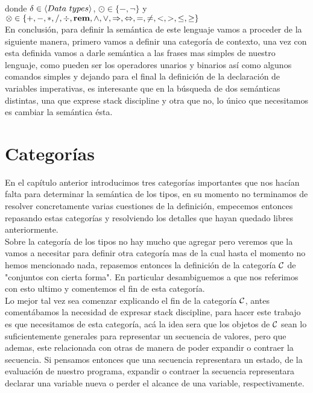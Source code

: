 donde $\delta \in \lrangles{Data \ types}$, $\odot \in \{-, \neg\}$ y 
$\otimes \in \{+,-,*,/,\div,\textbf{rem},\wedge,\vee,\Rightarrow,\Leftrightarrow, =,\neq,<,>,\leq,\geq\}$\\

En conclusi\'on, para definir la sem\'antica de este lenguaje vamos 
a proceder de la siguiente manera, primero vamos a definir una categor\'ia
de contexto, una vez con esta definida vamos a darle sem\'antica a las frases
mas simples de nuestro lenguaje, como pueden ser los operadores unarios y binarios
as\'i como algunos comandos simples y dejando para el final la definici\'on
de la declaraci\'on de variables imperativas, es interesante que en la 
b\'usqueda de dos sem\'anticas distintas, una que exprese stack discipline
y otra que no, lo \'unico que necesitamos es cambiar la sem\'antica \'esta.

\section{Categor\'ias}

En el cap\'itulo anterior introducimos tres categor\'ias importantes que
nos hac\'ian falta para determinar la sem\'antica de los tipos, en su
momento no terminamos de resolver concretamente varias cuestiones de la
definici\'on, empecemos entonces repasando estas categor\'ias y resolviendo
los detalles que hayan quedado libres anteriormente. \\
Sobre la categor\'ia de los tipos no hay mucho que agregar pero veremos que
la vamos a necesitar para definir otra categor\'ia mas de la cual hasta el
momento no hemos mencionado nada, repasemos entonces la definici\'on de la
categor\'ia $\mathcal{C}$ de "conjuntos con cierta forma". En particular desambiguemos 
a que nos referimos con esto ultimo y comentemos el fin de esta categor\'ia.\\

Lo mejor tal vez sea comenzar explicando el fin de la categor\'ia $\mathcal{C}$, antes
coment\'abamos la necesidad de expresar stack discipline, para hacer este
trabajo es que necesitamos de esta categor\'ia, ac\'a la idea sera que los
objetos de $\mathcal{C}$ sean lo suficientemente generales para representar un secuencia
de valores, pero que ademas, este relacionada con otras de manera de poder
expandir o contraer la secuencia. Si pensamos entonces que una secuencia 
representara un estado, de la evaluaci\'on de nuestro programa, expandir o
contraer la secuencia representara declarar una variable nueva o perder el
alcance de una variable, respectivamente.\\

